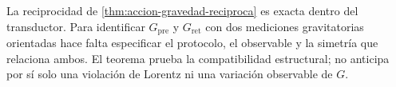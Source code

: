 \begin{remark}
La reciprocidad de \cref{thm:accion-gravedad-reciproca} es exacta dentro del
transductor. Para identificar \(G_{\mathrm{pre}}\) y \(G_{\mathrm{ret}}\) con dos
mediciones gravitatorias orientadas hace falta especificar el protocolo, el
observable y la simetría que relaciona ambos. El teorema prueba la
compatibilidad estructural; no anticipa por sí solo una violación de Lorentz
ni una variación observable de \(G\).
\end{remark}
